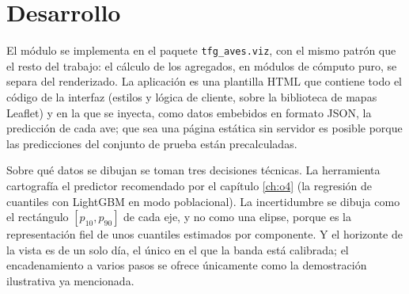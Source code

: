 \section{Desarrollo}
\label{sec:o5-desarrollo}

El módulo se implementa en el paquete \texttt{tfg\_aves.viz}, con el mismo patrón que el
resto del trabajo: el cálculo de los agregados, en módulos de cómputo puro, se separa
del renderizado. La aplicación es una plantilla HTML que contiene todo el código de la
interfaz (estilos y lógica de cliente, sobre la biblioteca de mapas Leaflet) y en la que
se inyecta, como datos embebidos en formato JSON, la predicción de cada ave; que sea una
página estática sin servidor es posible porque las predicciones del conjunto de prueba
están precalculadas.

Sobre qué datos se dibujan se toman tres decisiones técnicas. La herramienta cartografía
el predictor recomendado por el capítulo \ref{ch:o4} (la regresión de cuantiles con
LightGBM en modo poblacional). La incertidumbre se dibuja como
el rectángulo $[p_{10}, p_{90}]$ de cada eje, y no como una elipse, porque es la
representación fiel de unos cuantiles estimados por componente. Y el horizonte de la
vista es de un solo día, el único en el que la banda está calibrada; el encadenamiento a
varios pasos se ofrece únicamente como la demostración ilustrativa ya mencionada.

